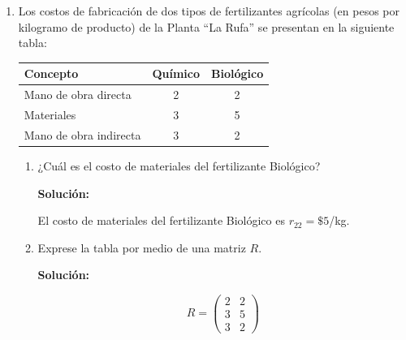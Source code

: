 \documentclass[12pt]{article}
\newcommand{\solucion}{%
    \vspace{0.8em}%
    \textbf{Solución:}%
}
\begin{document}
\begin{enumerate}[label=\alph*.-]
\begin{enumerate}[label=\roman*)]
        \solucion

        La segunda fila $(t_{21},\,t_{22}) = (3,\,5)$ representa los \textbf{costos de materiales}
        del fertilizante Químico (\$3/kg) y del fertilizante Biológico (\$5/kg).

        \item ¿Qué representa el elemento $t_{31}$? ¿Y el $t_{12}$?

        \solucion

        $t_{31}=5$: costo de \textbf{mano de obra indirecta} del fertilizante \textbf{Químico} = \$5/kg.\\
        $t_{12}=3$: costo de \textbf{mano de obra directa} del fertilizante \textbf{Biológico} = \$3/kg.
    \end{enumerate}

    \newpage
    \item Los costos de fabricación de dos tipos de fertilizantes agrícolas (en pesos por kilogramo de producto) de la Planta ``La Rufa'' se presentan en la siguiente tabla:

    \begin{center}
    \begin{tabular}{|l|c|c|}
    \hline
    \textbf{Concepto} & \textbf{Químico} & \textbf{Biológico} \\
    \hline
    Mano de obra directa & 2 & 2 \\
    \hline
    Materiales & 3 & 5 \\
    \hline
    Mano de obra indirecta & 3 & 2 \\
    \hline
    \end{tabular}
    \end{center}

    \begin{enumerate}[label=\roman*)]
        \item ¿Cuál es el costo de materiales del fertilizante Biológico?

        \solucion

        El costo de materiales del fertilizante Biológico es $r_{22}=\$5$/kg.

        \item Exprese la tabla por medio de una matriz $R$.

        \solucion
        \[
        R = \begin{pmatrix} 2 & 2 \\ 3 & 5 \\ 3 & 2 \end{pmatrix}
        \]


\end{enumerate}
\end{enumerate}
\end{document}
